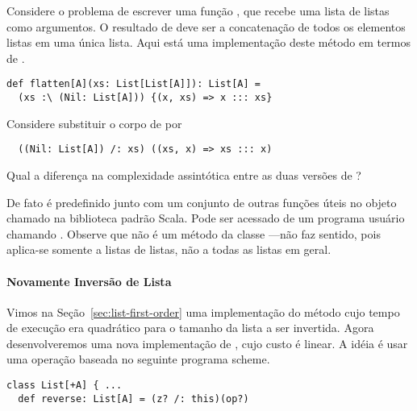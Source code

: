 \begin{exercise} Considere o problema de escrever uma função , que recebe 
uma lista de listas como argumentos. O resultado de  deve ser a concatenação 
de todos os elementos listas em uma única lista. Aqui está uma implementação deste método 
em termos de 
\code{:\\}.
\begin{lstlisting}
def flatten[A](xs: List[List[A]]): List[A] =
  (xs :\ (Nil: List[A])) {(x, xs) => x ::: xs}
\end{lstlisting} 
Considere substituir o corpo de  \lstinline@flatten@ por 
\begin{lstlisting}
  ((Nil: List[A]) /: xs) ((xs, x) => xs ::: x)
\end{lstlisting}
Qual a diferença na complexidade assintótica entre as duas versões de \lstinline@flatten@? 

De fato  é predefinido junto com um conjunto de outras funções úteis no objeto 
chamado  na biblioteca padrão Scala. Pode ser acessado de um programa usuário 
chamando . Observe que  não é um método da classe
---não faz sentido, pois aplica-se somente a listas de listas, não a todas as
listas em geral. 

\end{exercise}

\paragraph{Novamente Inversão de Lista} Vimos na Seção~\ref{sec:list-first-order} uma 
implementação do método  cujo tempo de execução era quadrático para o 
tamanho da lista a ser invertida. Agora desenvolveremos uma nova implementação de
, cujo custo é linear. A idéia é usar uma operação  
baseada no seguinte programa scheme.
\begin{lstlisting}
class List[+A] { ...
  def reverse: List[A] = (z? /: this)(op?)
\end{lstlisting}


